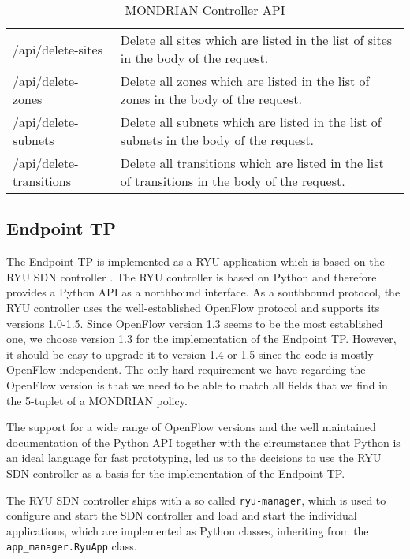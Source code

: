 \begin{table}[t]
\begin{tabular}{@{}p{}p{}@{}}
/api/delete-sites & Delete all sites which are listed in the list of sites in the body of the request.\\
/api/delete-zones & Delete all zones which are listed in the list of zones in the body of the request.\\
/api/delete-subnets & Delete all subnets which are listed in the list of subnets in the body of the request.\\
/api/delete-transitions & Delete all transitions which are listed in the list of transitions in the body of the request.\\
\bottomrule
\end{tabular}
\caption{MONDRIAN Controller API}
\label{MONDRIAN Controller API}
\end{table}
    
\FloatBarrier
\subsection{Endpoint TP}
The Endpoint \acs{TP} is implemented as a RYU application which is based on the RYU \acs{SDN} controller \cite{RYU2021docs}. The RYU controller is based on Python and therefore provides a Python \acs{API} as a northbound interface. As a southbound protocol, the RYU controller uses the well-established OpenFlow protocol and supports its versions 1.0-1.5. Since OpenFlow version 1.3 seems to be the most established one, we choose version 1.3 for the implementation of the Endpoint \acs{TP}. However, it should be easy to upgrade it to version 1.4 or 1.5 since the code is mostly OpenFlow independent. The only hard requirement we have regarding the OpenFlow version is that we need to be able to match all fields that we find in the 5-tuplet of a MONDRIAN policy.

The support for a wide range of OpenFlow versions and the well maintained documentation of the Python \acs{API} together with the circumstance that Python is an ideal language for fast prototyping, led us to the decisions to use the RYU \acs{SDN} controller as a basis for the implementation of the Endpoint \acs{TP}.

The RYU \acs{SDN} controller ships with a so called \texttt{ryu-manager}, which is used to configure and start the \acs{SDN} controller and load and start the individual applications, which are implemented as Python classes, inheriting from the \texttt{app\_manager.RyuApp} class.

